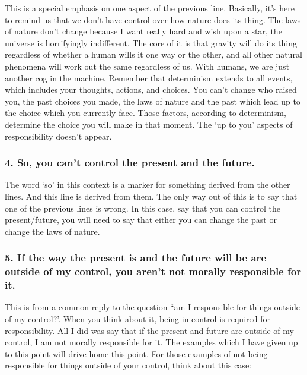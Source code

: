 This is a special emphasis on one aspect of the previous line. Basically, it's here to remind us that we don't have control over how nature does its thing. The laws of nature don't change because I want really hard and wish upon a star, the universe is horrifyingly indifferent. The core of it is that gravity will do its thing regardless of whether a human wills it one way or the other, and all other natural phenomena will work out the same regardless of us. With humans, we are just another cog in the machine. Remember that determinism extends to all events, which includes your thoughts, actions, and choices. You can't change who raised you, the past choices you made, the laws of nature and the past which lead up to the choice which you currently face. Those factors, according to determinism, determine the choice you will make in that moment. The `up to you' aspects of responsibility doesn't appear.
\subsubsection{4. So, you can't control the present and the future.}

The word ‘so’ in this context is a marker for something derived from the other lines. And this line is derived from them. The only way out of this is to say that one of the previous lines is wrong. In this case, say that you can control the present/future, you will need to say that either you can change the past or change the laws of nature.
\subsubsection{5. If the way the present is and the future will be are outside of my control, you aren't not morally responsible for it.}

This is from a common reply to the question “am I responsible for things outside of my control?’. When you think about it,  being-in-control is required for responsibility. All I did was say that if the present and future are outside of my control, I am not morally responsible for it. The examples which I have given up to this point will drive home this point. For those examples of not being responsible for things outside of your control, think about this case:


